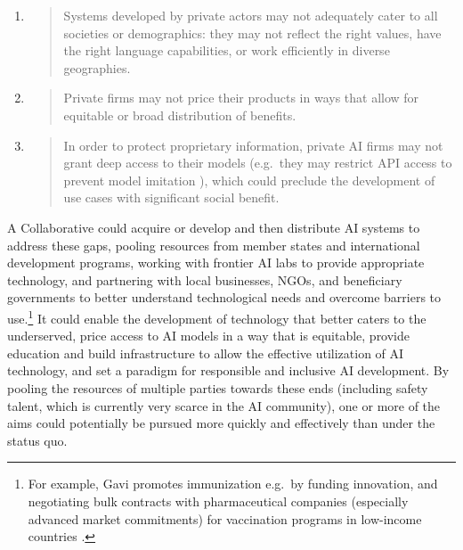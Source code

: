 \documentclass[12pt]{article}
\begin{document}
\begin{enumerate}
\def\labelenumi{\arabic{enumi}.}
\item
\begin{quote}
Systems developed by private actors may not adequately cater to all
societies or demographics: they may not reflect the right values, have
the right language capabilities, or work efficiently in diverse
geographies\cite{mohamed_decolonial_2020}.
\end{quote}
\item
\begin{quote}
Private firms may not price their products in ways that allow for
equitable or broad distribution of benefits.
\end{quote}
\item
\begin{quote}
In order to protect proprietary information, private AI firms may not
grant deep access to their models (e.g.\ they may restrict API access
to prevent model imitation \cite{taori_alpaca_2023}),
which could preclude the development of use cases with significant
social benefit.
\end{quote}
\end{enumerate}

A Collaborative could acquire or develop and then distribute AI systems
to address these gaps, pooling resources from member states and
international development programs, working with frontier AI labs to
provide appropriate technology, and partnering with local businesses,
NGOs, and beneficiary governments to better understand technological
needs and overcome barriers to use.\footnote{For example, Gavi promotes
immunization e.g.\ by funding innovation, and negotiating bulk contracts with
pharmaceutical companies (especially advanced market commitments) for
vaccination programs in low-income countries \cite{noauthor_what_2020}.}
It could enable the development of technology that better caters to the
underserved, \cite{mohamed_decolonial_2020} price access to AI models in
a way that is equitable, provide education and build infrastructure to
allow the effective utilization of AI technology, and set a paradigm for
responsible and inclusive AI development. By pooling the resources of
multiple parties towards these ends (including safety talent, which is
currently very scarce in the AI community), one or more of the aims
could potentially be pursued more quickly and effectively than under the
status quo.
\end{document}
